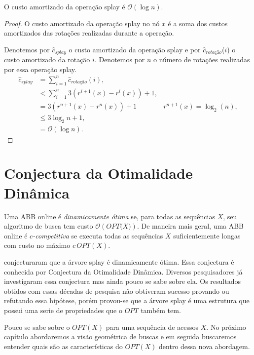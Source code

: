 \begin{theorem}
    O custo amortizado da operação splay é \( \mathcal{O}(\log n) \).
\end{theorem}

\begin{proof}
    O custo amortizado da operação splay no nó $x$ é a soma dos custos amortizados das rotações realizadas durante a operação.

    Denotemos por $\hat{c}_{\textit{splay}}$ o custo amortizado da operação splay e por $\hat{c}_{\textit{rotação}}$($i$) o custo amortizado da rotação $i$. Denotemos por $n$ o número de rotações realizadas por essa operação splay.
    \begin{align*}
        \hat{c}_{\textit{splay}} &= \sum_{i = 1}^{n} \hat{c}_{\textit{rotação}}(i), \\
        &< \sum_{i = 1}^{n} {3(r^{i+1}(x) - r^{i}(x)) + 1}, \\
        &= 3(r^{n+1}(x) - r^{n}(x)) + 1 \quad & \text{$r^{n+1}(x) = \log_2(n)$}, \\ 
        &\leq 3\log_2n + 1, \\ 
        &= \mathcal{O}(\log n).
    \end{align*}
\end{proof}


\section{Conjectura da Otimalidade Dinâmica}

Uma ABB online é \textit{dinamicamente ótima} se, para todas as sequências $X$, seu algoritmo de busca tem custo $\mathcal{O}(\textit{OPT(X)})$. De maneira mais geral, uma ABB online é \textit{$c$-competitiva} se executa todas as sequências $X$ suficientemente longas com custo no máximo $c$\,$OPT(X)$.

\cite{selfadjustingbst} conjecturaram que a árvore splay é dinamicamente ótima. Essa conjectura é conhecida por Conjectura da Otimalidade Dinâmica. Diversos pesquisadores já investigaram essa conjectura mas ainda pouco se sabe sobre ela. Os resultados obtidos com essas décadas de pesquisa não obtiveram sucesso provando ou refutando essa hipótese, porém provou-se que a árvore splay é uma estrutura que possui uma serie de propriedades que o $OPT$ também tem. 

Pouco se sabe sobre o $OPT(X)$ para uma sequência de acessos $X$. No próximo capítulo abordaremos a visão geométrica de buscas e em seguida buscaremos entender quais são as características do $OPT(X)$ dentro dessa nova abordagem. 